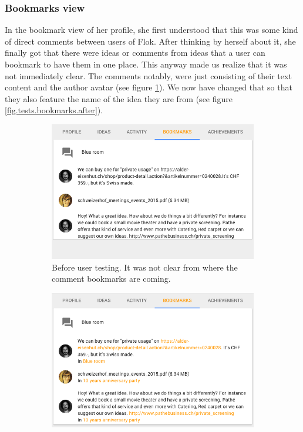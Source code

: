 \documentclass[a4paper,12pt, oneside]{article}
\begin{document}
\subsubsection*{Bookmarks view}
In the bookmark view of her profile, she first understood that this was some kind of direct comments between users of Flok.
After thinking by herself about it, she finally got that there were ideas or comments from ideas that a user can bookmark to have them in one place.
This anyway made us realize that it was not immediately clear.
The comments notably, were just consisting of their text content and the author avatar (see figure \ref{fig.tests.bookmarks.before}).
We now have changed that so that they also feature the name of the idea they are from (see figure \ref{fig.tests.bookmarks.after}).

\begin{figure}[!htb]
    \begin{subfigure}[t]{.495\textwidth}
        \includegraphics[width=\textwidth]{images/user_tests/bookmarks_before.png}
        \caption{Before user testing. It was not clear from where the comment bookmarks are coming.}
        \label{fig.tests.bookmarks.before}
    \end{subfigure}
    \hfill
    \begin{subfigure}[t]{.495\textwidth}
        \includegraphics[width=\textwidth]{images/user_tests/bookmarks_after.png}

\end{subfigure}
\end{figure}
\end{document}
